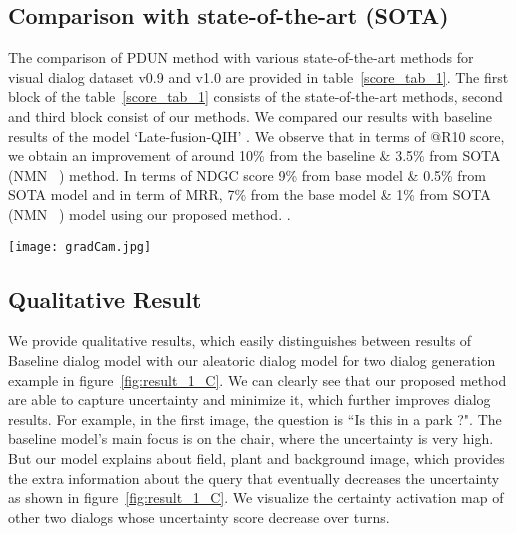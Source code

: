 \documentclass[review]{elsarticle}
\begin{document}
\subsection{Comparison with state-of-the-art (SOTA)}\label{baseline_sota}
The comparison of PDUN method with various state-of-the-art methods for visual dialog dataset v0.9 and v1.0 are provided in table~\ref{score_tab_1}.  The first block of the  table~\ref{score_tab_1} consists of the state-of-the-art methods, second and third block consist of our methods. We compared our results with baseline results of the model `Late-fusion-QIH' \cite{Das_CVPR2017}. We observe that in terms of @R10 score, we obtain an improvement of around 10\% from the baseline \& 3.5\% from SOTA (NMN  ~\cite{kottur2018visual}) method. In terms of NDGC score 9\% from base model \& 0.5\% from SOTA model and in term of MRR, 7\% from the base model \& 1\% from SOTA (NMN  ~\cite{kottur2018visual}) model using our proposed method. .




\begin{figure*}[ht]
	\centering
	\texttt{[image: gradCam.jpg]}
	\vspace{-3em}
	\caption{Figure shows the difference between aleatoric dialog results and baseline dialog results. In this figure, the first row refers to Grad-CAM visualization of first example for baseline visual dialog model and second row refers to Grad-CAM visualization of first example for Aleatoric visual dialog model and same scheme is followed for next 2 rows. The first column indicates target Image and corresponding caption and starting from second column is the visualization of rounds of dialog from round 1 to 10.}
	\label{fig:result_1_C}
\end{figure*}
\vspace{-1em}
\subsection{Qualitative Result}\label{Results}
We provide qualitative results, which easily distinguishes between results of Baseline dialog model with our aleatoric dialog model for two dialog generation example in figure~\ref{fig:result_1_C}. We can clearly see that our proposed method are able to capture uncertainty and minimize it, which further improves dialog results. For example, in the first image, the question is ``Is this in a park ?". The baseline model's main focus is on the chair, where the uncertainty is very high. But our model explains about field, plant and background image, which provides the extra information about the query that eventually decreases the uncertainty as shown in figure~\ref{fig:result_1_C}. We visualize the certainty activation map  of other two dialogs whose uncertainty score decrease over turns. 
\end{document}

